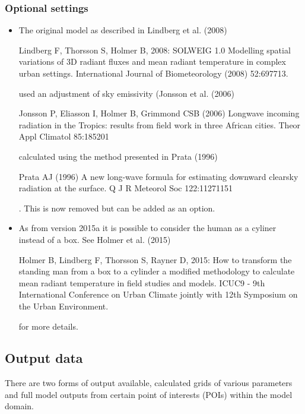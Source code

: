 \documentclass[letterpaper,10pt,english]{sphinxmanual}
\begin{document}
\subsubsection{Optional settings}
\label{\detokenize{OtherManuals/SOLWEIG:optional-settings}}\begin{itemize}
\item {} 
The original model as described in Lindberg et al. (2008)  %
\begin{footnote}[6]\sphinxAtStartFootnote
Lindberg F, Thorsson S, Holmer B, 2008: SOLWEIG 1.0 \textendash{} Modelling
spatial variations of 3D radiant fluxes and mean radiant temperature
in complex urban settings. International Journal of Biometeorology
(2008) 52:697\textendash{}713.
%
\end{footnote} used
an adjustment of sky emissivity (Jonsson et al. (2006)  %
\begin{footnote}[7]\sphinxAtStartFootnote
Jonsson P, Eliasson I, Holmer B, Grimmond CSB (2006) Longwave
incoming radiation in the Tropics: results from field work in three
African cities. Theor Appl Climatol 85:185\textendash{}201
%
\end{footnote}
calculated using the method presented in Prata (1996)  %
\begin{footnote}[8]\sphinxAtStartFootnote
Prata AJ (1996) A new long-wave formula for estimating downward
clearsky radiation at the surface. Q J R Meteorol Soc 122:1127\textendash{}1151
%
\end{footnote}. This is
now removed but can be added as an option.

\item {} 
As from version 2015a it is possible to consider the human as a
cyliner instead of a box. See Holmer et al. (2015)  %
\begin{footnote}[9]\sphinxAtStartFootnote
Holmer B, Lindberg F, Thorsson S, Rayner D, 2015: How to transform
the standing man from a box to a cylinder \textendash{} a modified methodology to
calculate mean radiant temperature in field studies and models. ICUC9
- 9th International Conference on Urban Climate jointly with 12th
Symposium on the Urban Environment.
%
\end{footnote} for more
details.

\end{itemize}


\subsection{Output data}
\label{\detokenize{OtherManuals/SOLWEIG:output-data}}
There are two forms of output available, calculated grids of various
parameters and full model outputs from certain point of interests (POIs)
within the model domain.
\end{document}
